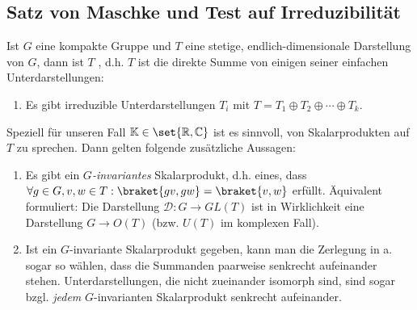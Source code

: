 \subsection{Satz von Maschke und Test auf Irreduzibilität}

\begin{theorem}\label{darstellungen:maschke}
Ist $G$ eine kompakte Gruppe und $T$ eine stetige, endlich-dimensionale Darstellung von $G$, dann ist $T$ , d.h. $T$ ist die direkte Summe von einigen seiner einfachen Unterdarstellungen:
\begin{enumerate}
\item Es gibt irreduzible Unterdarstellungen $T_i$ mit $T=T_1\oplus T_2\oplus\cdots\oplus T_k$.
\end{enumerate}

Speziell für unseren Fall $\IK\in\set{\IR,\IC}$ ist es sinnvoll, von Skalarprodukten auf $T$ zu sprechen. Dann gelten folgende zusätzliche Aussagen:
\begin{enumerate}[resume]
\item Es gibt ein \emph{$G$-invariantes} Skalarprodukt, d.h. eines, dass $\forall g\in G, v,w\in T: \braket{gv,gw} = \braket{v,w}$ erfüllt. Äquivalent formuliert: Die Darstellung $\mathcal{D}: G\to GL(T)$ ist in Wirklichkeit eine Darstellung $G\to O(T)$ (bzw. $U(T)$ im komplexen Fall).
\item Ist ein $G$-invariante Skalarprodukt gegeben, kann man die Zerlegung in a. sogar so wählen, dass die Summanden paarweise senkrecht aufeinander stehen. Unterdarstellungen, die nicht zueinander isomorph sind, sind sogar bzgl. \emph{jedem} $G$-invarianten Skalarprodukt senkrecht aufeinander.
\end{enumerate}
\end{theorem}
